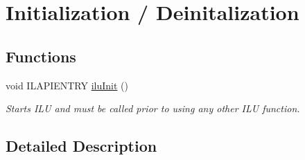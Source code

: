 \hypertarget{group__ilu__setup}{\section{Initialization / Deinitalization}
\label{group__ilu__setup}
}
\subsection*{Functions}
\begin{DoxyCompactItemize}
\item 
\hypertarget{group__ilu__setup_ga93e0f1da1027ae92b2218963f1bfd334}{void I\-L\-A\-P\-I\-E\-N\-T\-R\-Y \hyperlink{group__ilu__setup_ga93e0f1da1027ae92b2218963f1bfd334}{ilu\-Init} ()}\label{group__ilu__setup_ga93e0f1da1027ae92b2218963f1bfd334}

\begin{DoxyCompactList}\small\item\em Starts I\-L\-U and must be called prior to using any other I\-L\-U function. \end{DoxyCompactList}\end{DoxyCompactItemize}


\subsection{Detailed Description}
